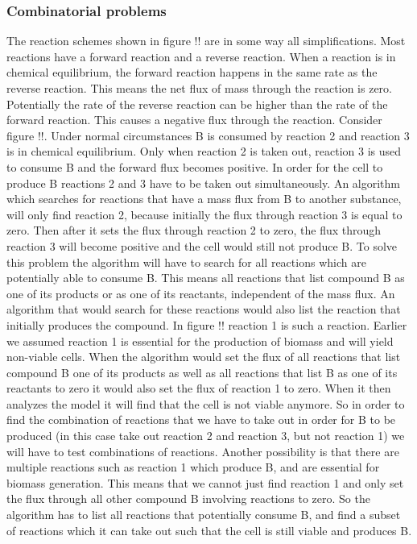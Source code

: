 \documentclass[10pt]{report}
\begin{document}
\subsubsection{Combinatorial problems}
The reaction schemes shown in figure !! are in some way all simplifications. Most reactions have a forward reaction and a reverse reaction. When a reaction is in chemical equilibrium, the forward reaction happens in the same rate as the reverse reaction. This means the net flux of mass through the reaction is zero. Potentially the rate of the reverse reaction can be higher than the rate of the forward reaction. This causes a negative flux through the reaction.
Consider figure !!. Under normal circumstances B is consumed by reaction 2 and reaction 3 is in chemical equilibrium.
Only when reaction 2 is taken out, reaction 3 is used to consume B and the forward flux becomes positive.
In order for the cell to produce B reactions 2 and 3 have to be taken out simultaneously.
An algorithm which searches for reactions that have a mass flux from B to another substance, will only find reaction 2, because initially the flux through reaction 3 is equal to zero. Then after it sets the flux through reaction 2 to zero, the flux through reaction 3 will become positive and the cell would still not produce B. 
To solve this problem the algorithm will have to search for all reactions which are potentially able to consume B. This means all reactions that list compound B as one of its products or as one of its reactants, independent of the mass flux.
An algorithm that would search for these reactions would also list the reaction that initially produces the compound. In figure !! reaction 1 is such a reaction.
Earlier we assumed reaction 1 is essential for the production of biomass and will yield non-viable cells.
When the algorithm would set the flux of all reactions that list compound B one of its products as well as all reactions that list B as one of its reactants to zero it would also set the flux of reaction 1 to zero. When it then analyzes the model it will find that the cell is not viable anymore. So in order to find the combination of reactions that we have to take out in order for B to be produced (in this case take out reaction 2 and reaction 3, but not reaction 1) we will have to test combinations of reactions.
Another possibility is that there are multiple reactions such as reaction 1 which produce B, and are essential for biomass generation.
This means that we cannot just find reaction 1 and only set the flux through all other compound B involving reactions to zero.
So the algorithm has to list all reactions that potentially consume B, and find a subset of reactions which it can take out such that the cell is still viable and produces B.
\end{document}
